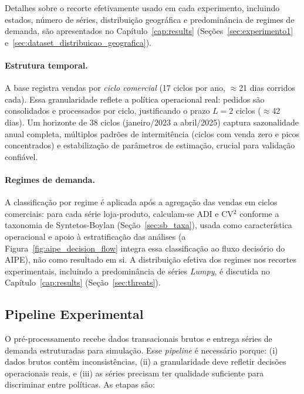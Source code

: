 Detalhes sobre o recorte efetivamente usado em cada experimento, incluindo estados, número de séries, distribuição geográfica e predominância de regimes de demanda, são apresentados no Capítulo~\ref{cap:results} (Seções~\ref{sec:experimento1} e~\ref{sec:dataset_distribuicao_geografica}).

\paragraph{Estrutura temporal.} A base registra vendas por \textit{ciclo comercial} (17 ciclos por ano, $\approx$21 dias corridos cada). Essa granularidade reflete a política operacional real: pedidos são consolidados e processados por ciclo, justificando o prazo $L=2$ ciclos ($\approx$42 dias). Um horizonte de 38 ciclos (janeiro/2023 a abril/2025) captura sazonalidade anual completa, múltiplos padrões de intermitência (ciclos com venda zero e picos concentrados) e estabilização de parâmetros de estimação, crucial para validação confiável.

\paragraph{Regimes de demanda.} A classificação por regime é aplicada após a agregação das vendas em ciclos comerciais: para cada série loja-produto, calculam-se ADI e CV$^2$ conforme a taxonomia de Syntetos-Boylan (Seção~\ref{sec:sb_taxa}), usada como característica operacional e apoio à estratificação das análises (a Figura~\ref{fig:aipe_decision_flow} integra essa classificação ao fluxo decisório do AIPE), não como resultado em si. A distribuição efetiva dos regimes nos recortes experimentais, incluindo a predominância de séries \textit{Lumpy}, é discutida no Capítulo~\ref{cap:results} (Seção~\ref{sec:threats}).

\subsection{Pipeline Experimental}
\label{sec:pipeline_experimental}

O pré-processamento recebe dados transacionais brutos e entrega séries de demanda estruturadas para simulação. Esse \textit{pipeline} é necessário porque: (i) dados brutos contêm inconsistências, (ii) a granularidade deve refletir decisões operacionais reais, e (iii) as séries precisam ter qualidade suficiente para discriminar entre políticas. As etapas são:

